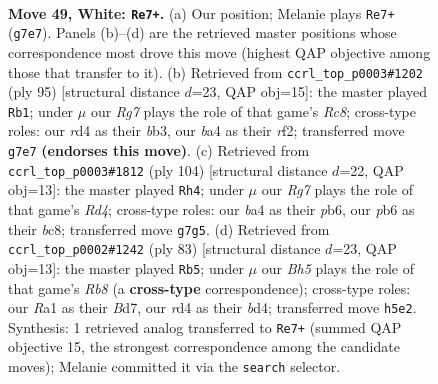 \documentclass[11pt]{article}
\begin{document}
\clearpage

\begin{figure}[p]\centering
\begin{subfigure}{0.46\textwidth}\centering
\resizebox{\linewidth}{!}{%
\newchessgame
\chessboard[
  setfen={r7/6R1/pp6/4k2B/bP1r4/P6K/8/R7 w - - 0 49},
  showmover=false,
  pgfstyle=straightmove, color=movearrow, markmove={g7-e7}
]}
\caption{}
\end{subfigure}\hfill
\begin{subfigure}{0.46\textwidth}\centering
\resizebox{\linewidth}{!}{%
\newchessgame
\chessboard[
  setfen={8/5pk1/2b1p3/8/3K1PP1/1B6/5R2/2r5 b - - 0 48},
  showmover=false,
  pgfstyle=straightmove, color=movearrow, markmove={c1-b1}
]}
\caption{}
\end{subfigure}
\\[4pt]
\begin{subfigure}{0.46\textwidth}\centering
\resizebox{\linewidth}{!}{%
\newchessgame
\chessboard[
  setfen={2b5/p3k3/1p6/1P3r2/P1BR4/8/1K6/8 w - - 1 53},
  showmover=false,
  pgfstyle=straightmove, color=movearrow, markmove={d4-h4}
]}
\caption{}
\end{subfigure}\hfill
\begin{subfigure}{0.46\textwidth}\centering
\resizebox{\linewidth}{!}{%
\newchessgame
\chessboard[
  setfen={6k1/3b2p1/6p1/R7/3B1p1P/5P2/6PK/1r6 b - - 6 42},
  showmover=false,
  pgfstyle=straightmove, color=movearrow, markmove={b1-b5}
]}
\caption{}
\end{subfigure}
\caption{\textbf{Move 49, White: \texttt{Re7+}.} (a) Our position; Melanie plays \texttt{Re7+} (\texttt{g7e7}). Panels (b)--(d) are the retrieved master positions whose correspondence most drove this move (highest QAP objective among those that transfer to it). (b) Retrieved from \texttt{ccrl\_top\_p0003\#1202} (ply 95) [structural distance $d$=23, QAP obj=15]: the master played \texttt{Rb1}; under $\mu$ our \emph{Rg7} plays the role of that game's \emph{Rc8}; cross-type roles: our \emph{r}d4 as their \emph{b}b3, our \emph{b}a4 as their \emph{r}f2; transferred move \texttt{g7e7} \textbf{(endorses this move)}. (c) Retrieved from \texttt{ccrl\_top\_p0003\#1812} (ply 104) [structural distance $d$=22, QAP obj=13]: the master played \texttt{Rh4}; under $\mu$ our \emph{Rg7} plays the role of that game's \emph{Rd4}; cross-type roles: our \emph{b}a4 as their \emph{p}b6, our \emph{p}b6 as their \emph{b}c8; transferred move \texttt{g7g5}. (d) Retrieved from \texttt{ccrl\_top\_p0002\#1242} (ply 83) [structural distance $d$=23, QAP obj=13]: the master played \texttt{Rb5}; under $\mu$ our \emph{Bh5} plays the role of that game's \emph{Rb8} (a \textbf{cross-type} correspondence); cross-type roles: our \emph{R}a1 as their \emph{B}d7, our \emph{r}d4 as their \emph{b}d4; transferred move \texttt{h5e2}. Synthesis: 1 retrieved analog transferred to \texttt{Re7+} (summed QAP objective 15, the strongest correspondence among the candidate moves); Melanie committed it via the \texttt{search} selector.}
\label{fig:thought-m96}
\end{figure}
\end{document}
